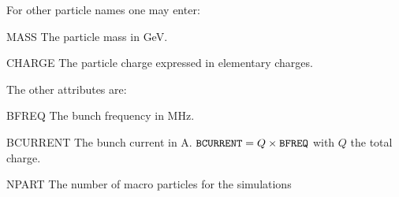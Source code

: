 For other particle names one may enter:
\begin{kdescription}
\item[MASS]
  The particle mass in GeV.
\item[CHARGE]
  The particle charge expressed in elementary charges.
\end{kdescription}

The other attributes are:

\begin{kdescription}
\item[BFREQ]
  The bunch frequency in MHz.
\item[BCURRENT]
The bunch current in A.
$\text{\keyword{BCURRENT}} = Q \times \text{\keyword{BFREQ}}$ with $Q$ the total charge.
\item[NPART]
The number of macro particles for the simulations
\end{kdescription}

